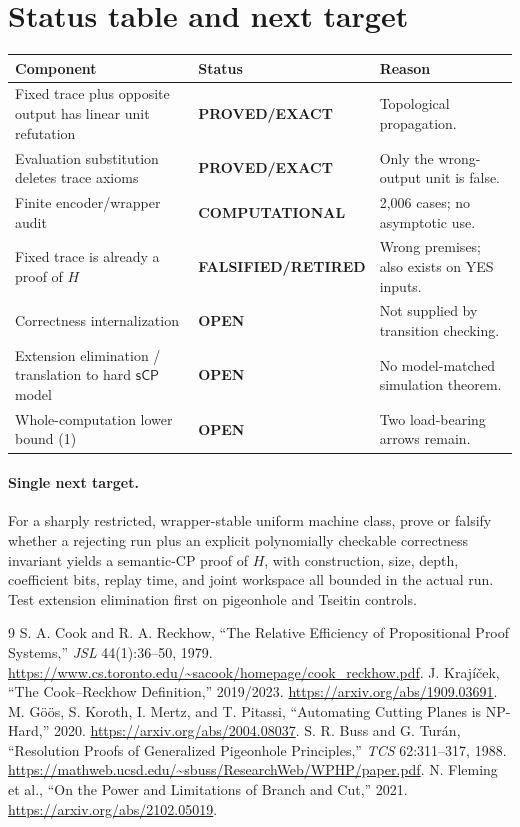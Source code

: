 \documentclass[11pt]{article}
\newcommand{\sCP}{\mathsf{sCP}}
\newcommand{\EXACT}{\textbf{PROVED/EXACT}}
\newcommand{\COMP}{\textbf{COMPUTATIONAL}}
\newcommand{\OPEN}{\textbf{OPEN}}
\newcommand{\RET}{\textbf{FALSIFIED/RETIRED}}
\begin{document}
\section{Status table and next target}
\begin{tabularx}{\textwidth}{@{}l l X@{}}
\toprule
Component & Status & Reason\\
\midrule
Fixed trace plus opposite output has linear unit refutation & \EXACT & Topological propagation.\\
Evaluation substitution deletes trace axioms & \EXACT & Only the wrong-output unit is false.\\
Finite encoder/wrapper audit & \COMP & 2,006 cases; no asymptotic use.\\
Fixed trace is already a proof of \(H\) & \RET & Wrong premises; also exists on YES inputs.\\
Correctness internalization & \OPEN & Not supplied by transition checking.\\
Extension elimination / translation to hard \(\sCP\) model & \OPEN & No model-matched simulation theorem.\\
Whole-computation lower bound (1) & \OPEN & Two load-bearing arrows remain.\\
\bottomrule
\end{tabularx}

\paragraph{Single next target.}
For a sharply restricted, wrapper-stable uniform machine class, prove or
falsify whether a rejecting run plus an explicit polynomially checkable
correctness invariant yields a semantic-CP proof of \(H\), with construction,
size, depth, coefficient bits, replay time, and joint workspace all bounded in
the actual run.  Test extension elimination first on pigeonhole and Tseitin
controls.

\begin{thebibliography}{9}
 S. A. Cook and R. A. Reckhow,
``The Relative Efficiency of Propositional Proof Systems,''
\emph{JSL} 44(1):36--50, 1979.
\url{https://www.cs.toronto.edu/~sacook/homepage/cook_reckhow.pdf}.
 J. Kraj\'i\v{c}ek,
``The Cook--Reckhow Definition,'' 2019/2023.
\url{https://arxiv.org/abs/1909.03691}.
 M. G\"o\"os, S. Koroth, I. Mertz, and T. Pitassi,
``Automating Cutting Planes is NP-Hard,'' 2020.
\url{https://arxiv.org/abs/2004.08037}.
 S. R. Buss and G. Tur\'an,
``Resolution Proofs of Generalized Pigeonhole Principles,''
\emph{TCS} 62:311--317, 1988.
\url{https://mathweb.ucsd.edu/~sbuss/ResearchWeb/WPHP/paper.pdf}.
 N. Fleming et al.,
``On the Power and Limitations of Branch and Cut,'' 2021.
\url{https://arxiv.org/abs/2102.05019}.
\end{thebibliography}
\end{document}
